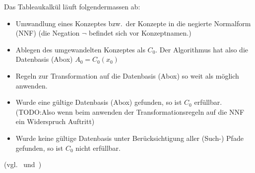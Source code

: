 \begin{table}[H]
\centering
{} \hfill
{}
\end{table}

Das Tableaukalkül läuft folgendermassen ab:
\begin{itemize}
    \item Umwandlung eines Konzeptes bzw.\ der Konzepte in die negierte Normalform (NNF) (die Negation $ \neg $ befindet sich vor Konzeptnamen.)
    \item Ablegen des umgewandelten Konzeptes als $ C_0 $.
        Der Algorithmus hat also die Datenbasis (Abox) $ A_0 = {C_0(x_0)} $
    \item Regeln zur Transformation auf die Datenbasis (Abox) so weit als möglich anwenden.
    \item Wurde eine gültige Datenbasis (Abox) gefunden, so ist $ C_0 $ erfüllbar. (TODO:\@ Also wenn beim anwenden der Transformationsregeln auf die NNF ein Widerspruch Auftritt)
    \item Wurde keine gültige Datenbasis unter Berücksichtigung aller (Such-) Pfade gefunden, so ist $ C_0 $ nicht erfüllbar.
\end{itemize} (vgl.~\cite{horrocks2002} und~\cite{horrocks2005})



